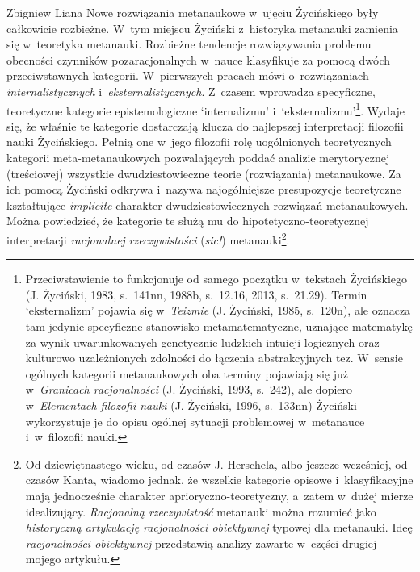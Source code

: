 \begin{artplenv}{Zbigniew Liana}
Nowe rozwiązania metanaukowe w~ujęciu Życińskiego były całkowicie rozbieżne. W~tym miejscu Życiński z~historyka
metanauki zamienia się w~teoretyka metanauki. Rozbieżne tendencje rozwiązywania problemu obecności czynników
pozaracjonalnych w~nauce klasyfikuje za pomocą dwóch przeciwstawnych kategorii. W~pierwszych pracach
mówi o~rozwiązaniach \textit{internalistycznych} i~\textit{eksternalistycznych}. Z~czasem wprowadza specyficzne, teoretyczne
kategorie epistemologiczne `internalizmu' i~`eksternalizmu'\footnote{Przeciwstawienie to funkcjonuje od samego
początku w~tekstach Życińskiego \label{ref:RNDhYHdk6Gn9I}(J. Życiński, 1983, s.~141nn, 1988b, s.~12.16, 2013, s.~21.29). Termin
`eksternalizm' pojawia się w~\textit{Teizmie} \label{ref:RNDqnijmYbBgM}(J. Życiński, 1985, s.~120n), ale oznacza tam
jedynie specyficzne stanowisko metamatematyczne, uznające matematykę za wynik uwarunkowanych genetycznie ludzkich
intuicji logicznych oraz kulturowo uzależnionych zdolności do łączenia abstrakcyjnych tez. W~sensie ogólnych kategorii
metanaukowych oba terminy pojawiają się już w~\textit{Granicach racjonalności} \label{ref:RND37pLqxd4Aa}(J. Życiński,
1993, s.~242), ale dopiero w~\textit{Elementach filozofii nauki} \label{ref:RNDY1V0zunmmK}(J. Życiński, 1996, s.~133nn)
Życiński wykorzystuje je do opisu ogólnej sytuacji problemowej w~metanauce i~w~filozofii nauki.}. Wydaje się, że
właśnie te kategorie dostarczają klucza do najlepszej interpretacji filozofii nauki Życińskiego. Pełnią one w~jego
filozofii rolę uogólnionych teoretycznych kategorii meta-metanaukowych pozwalających poddać analizie merytorycznej
(treściowej) wszystkie dwudziestowieczne teorie (rozwiązania) metanaukowe. Za ich pomocą Życiński odkrywa i~nazywa
najogólniejsze presupozycje teoretyczne kształtujące \textit{implicite} charakter dwudziestowiecznych rozwiązań
metanaukowych. Można powiedzieć, że kategorie te służą mu do hipotetyczno-teoretycznej interpretacji \textit{racjonalnej}
\textit{rzeczywistości} (\textit{sic!}) metanauki\footnote{Od dziewiętnastego wieku, od czasów J. Herschela, albo jeszcze
wcześniej, od czasów Kanta, wiadomo jednak, że wszelkie kategorie opisowe i~klasyfikacyjne mają jednocześnie charakter
aprioryczno-teoretyczny, a~zatem w~dużej mierze idealizujący. \textit{Racjonalną rzeczywistość }metanauki można rozumieć
jako \textit{historyczną artykulację racjonalności obiektywnej} typowej dla metanauki. Ideę \textit{racjonalności
obiektywnej} przedstawią analizy zawarte w~części drugiej mojego artykułu.}.


\end{artplenv}
